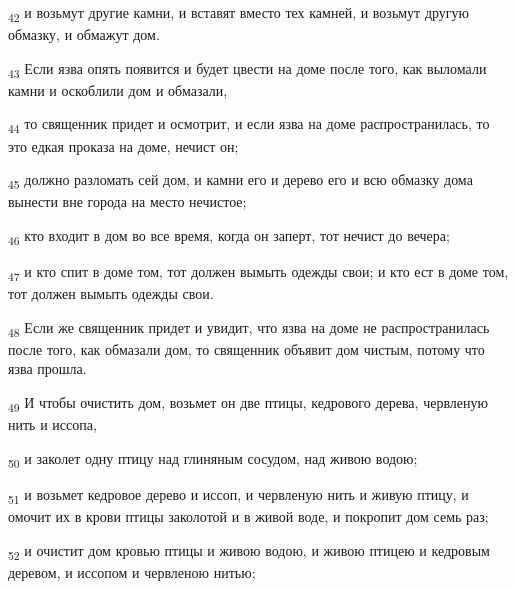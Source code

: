 \begin{tcolorbox}
\textsubscript{42} и возьмут другие камни, и вставят вместо тех камней, и возьмут другую обмазку, и обмажут дом.
\end{tcolorbox}
\begin{tcolorbox}
\textsubscript{43} Если язва опять появится и будет цвести на доме после того, как выломали камни и оскоблили дом и обмазали,
\end{tcolorbox}
\begin{tcolorbox}
\textsubscript{44} то священник придет и осмотрит, и если язва на доме распространилась, то это едкая проказа на доме, нечист он;
\end{tcolorbox}
\begin{tcolorbox}
\textsubscript{45} должно разломать сей дом, и камни его и дерево его и всю обмазку дома вынести вне города на место нечистое;
\end{tcolorbox}
\begin{tcolorbox}
\textsubscript{46} кто входит в дом во все время, когда он заперт, тот нечист до вечера;
\end{tcolorbox}
\begin{tcolorbox}
\textsubscript{47} и кто спит в доме том, тот должен вымыть одежды свои; и кто ест в доме том, тот должен вымыть одежды свои.
\end{tcolorbox}
\begin{tcolorbox}
\textsubscript{48} Если же священник придет и увидит, что язва на доме не распространилась после того, как обмазали дом, то священник объявит дом чистым, потому что язва прошла.
\end{tcolorbox}
\begin{tcolorbox}
\textsubscript{49} И чтобы очистить дом, возьмет он две птицы, кедрового дерева, червленую нить и иссопа,
\end{tcolorbox}
\begin{tcolorbox}
\textsubscript{50} и заколет одну птицу над глиняным сосудом, над живою водою;
\end{tcolorbox}
\begin{tcolorbox}
\textsubscript{51} и возьмет кедровое дерево и иссоп, и червленую нить и живую птицу, и омочит их в крови птицы заколотой и в живой воде, и покропит дом семь раз;
\end{tcolorbox}
\begin{tcolorbox}
\textsubscript{52} и очистит дом кровью птицы и живою водою, и живою птицею и кедровым деревом, и иссопом и червленою нитью;
\end{tcolorbox}
